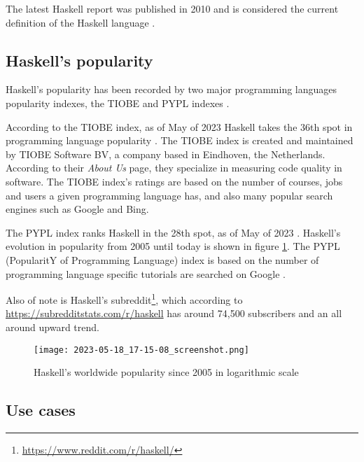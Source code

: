\documentclass[a4paper, titlepage, twoside]{article}
\begin{document}
The latest Haskell report was published in 2010 and is considered the current definition of the Haskell language \autocite{marlowHaskell2010Language2010,haskellwikiHaskellHaskellWiki2023}.

\subsection{Haskell's popularity}
\label{sec:orgfed8a6f}

Haskell's popularity has been recorded by two major programming languages popularity indexes, the TIOBE and PYPL indexes \autocites{carbonnellePYPLPopularitYProgramming2023}[][]{tiobeTIOBEIndex2023}.

According to the TIOBE index, as of May of 2023 Haskell takes the 36th spot in programming language popularity \autocite{tiobeTIOBEIndex2023}. The TIOBE index is created and maintained by TIOBE Software BV, a company based in Eindhoven, the Netherlands. According to their \emph{About Us} page, they specialize in measuring code quality in software. The TIOBE index's ratings are based on the number of courses, jobs and users a given programming language has, and also many popular search engines such as Google and Bing.

The PYPL index ranks Haskell in the 28th spot, as of May of 2023 \autocite{carbonnellePYPLPopularitYProgramming2023}. Haskell's evolution in popularity from 2005 until today is shown in figure \ref{fig:org3456e38}. The PYPL (PopularitY of Programming Language) index is based on the number of programming language specific tutorials are searched on Google \autocite{carbonnellePYPLPopularitYProgramming2023}.

Also of note is Haskell's subreddit\footnote{\url{https://www.reddit.com/r/haskell/}}, which according to \url{https://subredditstats.com/r/haskell} has around 74,500 subscribers and an all around upward trend.

\begin{figure}[htbp]
\centering
\texttt{[image: 2023-05-18\_17-15-08\_screenshot.png]}
\caption{\label{fig:org3456e38}Haskell's worldwide popularity since 2005 in logarithmic scale \autocite{carbonnellePYPLPopularitYProgramming2023}}
\end{figure}

\subsection{Use cases}
\label{sec:org59b1a91}
\end{document}
